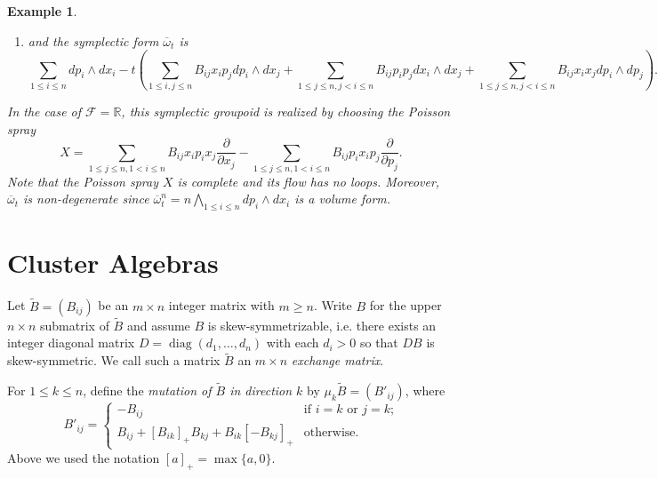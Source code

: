 \documentclass{amsart}
\newtheorem{example}[theorem]{Example}
\newcommand{\cF}{\mathcal{F}}
\newcommand{\RR}{\mathbb{R}}
\newcommand{\diag}{\operatorname{diag}}
\renewcommand{\max}{\operatorname{max}}
\begin{document}
\begin{example}
\begin{enumerate}
$$\begin{aligned}
				\end{aligned}
			$$
		\item and the symplectic form $\overline{\omega}_t$ is
		$$
			\sum_{1\leq i \leq n} dp_i \wedge dx_i
			- t \left(
			\sum_{1 \leq i, j \leq n} B_{ij}x_i p_j d p_i \wedge d x_j 
			+ \sum_{1 \leq j \leq n, j < i \leq n} B_{ij}p_ip_j d x_i \wedge d x_j
			+ \sum_{1 \leq j \leq n, j < i \leq n} B_{ij}x_ix_j d p_i \wedge d p_j
			\right).
		$$
	\end{enumerate}
	In the case of $\cF = \RR$, this symplectic groupoid is realized by choosing the Poisson spray
	$$
		X = \sum_{1 \leq j \leq n, 1 < i \leq n}B_{ij}x_ip_i x_j\frac{\partial}{\partial x_j} - \sum_{1 \leq j \leq n, 1 < i \leq n}B_{ij}p_ix_i p_j\frac{\partial}{\partial p_j}.
	$$
	Note that the Poisson spray $X$ is complete and its flow has no loops. Moreover, $\overline{\omega}_t$ is non-degenerate since $\overline{\omega}_t^n = n \bigwedge\limits_{1\leq i\leq n} dp_i \wedge dx_i$ is a volume form.
\end{example}


\section{Cluster Algebras}

Let $\tilde B=(B_{ij})$ be an $m\times n$ integer matrix with $m\ge n$.  
Write $B$ for the upper $n\times n$ submatrix of $\tilde B$ and assume $B$ is skew-symmetrizable, i.e. there exists an integer diagonal matrix $D=\diag(d_1,\ldots,d_n)$ with each $d_i>0$ so that $DB$ is skew-symmetric. 
We call such a matrix $\tilde B$ an $m\times n$ \emph{exchange matrix}.

For $1\le k\le n$, define the \emph{mutation of $\tilde B$ in direction $k$} by $\mu_k\tilde B=(B'_{ij})$, where
\[B'_{ij}=\begin{cases}-B_{ij} & \text{if $i=k$ or $j=k$;}\\ B_{ij}+[B_{ik}]_+B_{kj}+B_{ik}[-B_{kj}]_+ & \text{otherwise.}\end{cases}\]
Above we used the notation $[a]_+=\max\{a,0\}$.
\end{document}
